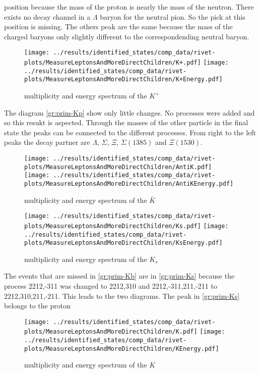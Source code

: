 position because the mass of the proton is nearly the mass of the neutron. 
There exists no decay channel in a \(\Lambda\) baryon for the neutral pion. So 
the pick at this position is missing. The others peak are the same because 
the mass of the charged baryons only slightly different to the correspondending
neutral baryon.
\begin{figure}[h]
  \centering
  \texttt{[image: ../results/identified\_states/comp\_data/rivet-plots/MeasureLeptonsAndMoreDirectChildren/K+.pdf]}
  \texttt{[image: ../results/identified\_states/comp\_data/rivet-plots/MeasureLeptonsAndMoreDirectChildren/K+Energy.pdf]}
  \caption{multiplicity and energy spectrum of the \(K^+\)} \label{gr:prim-Kp}
\end{figure}
The diagram {\eqref{gr:prim-Kp}} show only little changes. No processes were 
added and so this resukt is aspected. Through the masses of the other particle 
in the final state the peaks can be connected to the different processes. From 
right to the left peaks the decay partner are \(\Lambda\), \(\Sigma\), \(\Xi\),
\(\Sigma(1385)\) and \(\Xi(1530)\).
\begin{figure}[h]
  \centering
  \texttt{[image: ../results/identified\_states/comp\_data/rivet-plots/MeasureLeptonsAndMoreDirectChildren/AntiK.pdf]}
  \texttt{[image: ../results/identified\_states/comp\_data/rivet-plots/MeasureLeptonsAndMoreDirectChildren/AntiKEnergy.pdf]}
  \caption{multiplicity and energy spectrum of the \(\bar{K}\)} \label{gr:prim-Kb}
\end{figure}
\begin{figure}[h]
  \centering
  \texttt{[image: ../results/identified\_states/comp\_data/rivet-plots/MeasureLeptonsAndMoreDirectChildren/Ks.pdf]}
  \texttt{[image: ../results/identified\_states/comp\_data/rivet-plots/MeasureLeptonsAndMoreDirectChildren/KsEnergy.pdf]}
  \caption{multiplicity and energy spectrum of the \(K_s\)} \label{gr:prim-Ks}
\end{figure}
The events that are missed in {\eqref{gr:prim-Kb}} are in {\eqref{gr:prim-Ks}}
because the process 2212,-311 was changed to 2212,310 and 
2212,-311,211,-211 to 2212,310,211,-211. This leads to the two 
diagrams. The peak in {\eqref{gr:prim-Ks}} belongs to the proton
\begin{figure}[h]
  \centering
  \texttt{[image: ../results/identified\_states/comp\_data/rivet-plots/MeasureLeptonsAndMoreDirectChildren/K.pdf]}
  \texttt{[image: ../results/identified\_states/comp\_data/rivet-plots/MeasureLeptonsAndMoreDirectChildren/KEnergy.pdf]}
  \caption{multiplicity and energy spectrum of the \(K\)} 
\end{figure}
